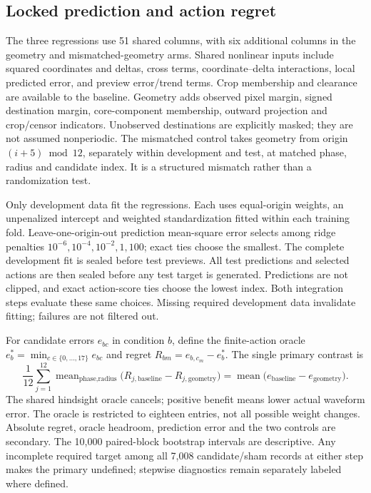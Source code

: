 \subsection{Locked prediction and action regret}
The three regressions use 51 shared columns, with six additional columns in the geometry and mismatched-geometry arms. Shared nonlinear inputs include squared coordinates and deltas, cross terms, coordinate--delta interactions, local predicted error, and preview error/trend terms. Crop membership and clearance are available to the baseline. Geometry adds observed pixel margin, signed destination margin, core-component membership, outward projection and crop/censor indicators. Unobserved destinations are explicitly masked; they are not assumed nonperiodic. The mismatched control takes geometry from origin $(i+5)\bmod12$, separately within development and test, at matched phase, radius and candidate index. It is a structured mismatch rather than a randomization test.

Only development data fit the regressions. Each uses equal-origin weights, an unpenalized intercept and weighted standardization fitted within each training fold. Leave-one-origin-out prediction mean-square error selects among ridge penalties $10^{-6},10^{-4},10^{-2},1,100$; exact ties choose the smallest. The complete development fit is sealed before test previews. All test predictions and selected actions are then sealed before any test target is generated. Predictions are not clipped, and exact action-score ties choose the lowest index. Both integration steps evaluate these same choices. Missing required development data invalidate fitting; failures are not filtered out.

For candidate errors $e_{bc}$ in condition $b$, define the finite-action oracle $e_b^*=\min_{c\in\{0,\ldots,17\}}e_{bc}$ and regret $R_{bm}=e_{b,c_m}-e_b^*$. The single primary contrast is
\[
\frac{1}{12}\sum_{j=1}^{12}\operatorname{mean}_{\text{phase,radius}}
\bigl(R_{j,\mathrm{baseline}}-R_{j,\mathrm{geometry}}\bigr)
=
\operatorname{mean}\bigl(e_{\mathrm{baseline}}-e_{\mathrm{geometry}}\bigr).
\]
The shared hindsight oracle cancels; positive benefit means lower actual waveform error. The oracle is restricted to eighteen entries, not all possible weight changes. Absolute regret, oracle headroom, prediction error and the two controls are secondary. The 10,000 paired-block bootstrap intervals are descriptive. Any incomplete required target among all 7,008 candidate/sham records at either step makes the primary undefined; stepwise diagnostics remain separately labeled where defined.

